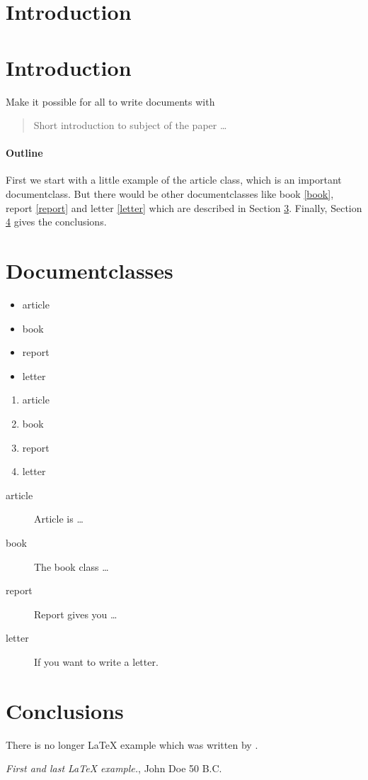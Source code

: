 \documentclass{article}
\begin{document}
\section{Introduction}




\section{Introduction}
Make it possible for all to write documents with

\begin{abstract}
Short introduction to subject of the paper \ldots
\end{abstract}

\paragraph{Outline}
First we start with a little example of the article class, which is an
important documentclass. But there would be other documentclasses like
book \ref{book}, report \ref{report} and letter \ref{letter} which are
described in Section \ref{documentclasses}. Finally, Section
\ref{conclusions} gives the conclusions.



\section{Documentclasses} \label{documentclasses}

\begin{itemize}
\item article
\item book
\item report
\item letter
\end{itemize}


\begin{enumerate}
\item article
\item book
\item report
\item letter
\end{enumerate}

\begin{description}
\item[article\label{article}]{Article is \ldots}
\item[book\label{book}]{The book class \ldots}
\item[report\label{report}]{Report gives you \ldots}
\item[letter\label{letter}]{If you want to write a letter.}
\end{description}


\section{Conclusions}\label{conclusions}
There is no longer \LaTeX{} example which was written by \cite{doe}.


\begin{thebibliography}{9}
 \emph{First and last \LaTeX{} example.},
John Doe 50 B.C.
\end{thebibliography}
\end{document}
